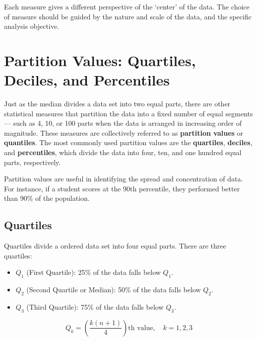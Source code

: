 \documentclass[twoside]{book}
\begin{document}
Each measure gives a different perspective of the `center' of the data. The choice of measure should be guided by the nature and scale of the data, and the specific analysis objective.

\section{Partition Values: Quartiles, Deciles, and Percentiles}

Just as the median divides a data set into two equal parts, there are other statistical measures that partition the data into a fixed number of equal segments — such as 4, 10, or 100 parts when the data is arranged in increasing order of magnitude. These measures are collectively referred to as \textbf{partition values} or \textbf{quantiles}. The most commonly used partition values are the \textbf{quartiles}, \textbf{deciles}, and \textbf{percentiles}, which divide the data into four, ten, and one hundred equal parts, respectively.

Partition values are useful in identifying the spread and concentration of data. For instance, if a student scores at the 90th percentile, they performed better than 90\% of the population.

\subsection{Quartiles}

Quartiles divide a ordered data set into four equal parts. There are three quartiles:

\begin{itemize}
    \item $Q_1$ (First Quartile): 25\% of the data falls below $Q_1$.
    \item $Q_2$ (Second Quartile or Median): 50\% of the data falls below $Q_2$.
    \item $Q_3$ (Third Quartile): 75\% of the data falls below $Q_3$.
\end{itemize}

\begin{textbox}
\[
Q_k = \left( \frac{k(n+1)}{4} \right)\text{th value}, \quad k = 1, 2, 3
\]
\end{textbox}

\end{document}
